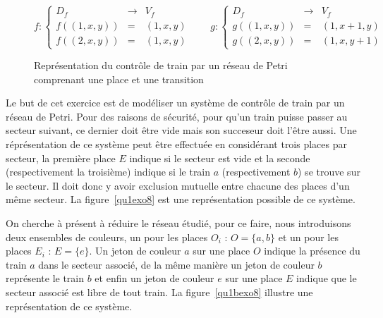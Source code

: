 \begin{figure}
    \begin{center}
    \end{center}
    \begin{displaymath}
        f : \left \lbrace
        \begin{array}{rcl}
            D_f & \rightarrow & V_f \\
            f((1, x, y)) & = & (1, x, y)\\
            f((2, x, y)) & = & (1, x, y)
        \end{array}
        \right . \qquad
        g : \left \lbrace
        \begin{array}{rcl}
            D_f & \rightarrow & V_f \\
            g((1, x, y)) & = & (1, x + 1, y) \\
            g((2, x, y)) & = & (1, x, y + 1)
        \end{array} 
        \right .
    \end{displaymath}
    \caption{Représentation du contrôle de train par un réseau de Petri comprenant une place et une
    transition}
    \label{bonusexo8}
\end{figure}

Le but de cet exercice est de modéliser un système de contrôle de train par un réseau de Petri. Pour
des raisons de sécurité, pour qu'un train puisse passer au secteur suivant, ce dernier doit être
vide mais son succeseur doit l'être aussi. Une réprésentation de ce système peut être effectuée en
considérant trois places par secteur, la première place $E$ indique si le secteur est vide et la
seconde (respectivement la troisième) indique si le train $a$ (respectivement $b$) se trouve sur le
secteur. Il doit donc y avoir exclusion mutuelle entre chacune des places d'un même secteur. La
figure~\ref{qu1exo8} est une représentation possible de ce système.

On cherche à présent à réduire le réseau étudié, pour ce faire, nous introduisons deux ensembles de
couleurs, un pour les places $O_i$ : $O = \{a, b\}$ et un pour les places $E_i$ : $E = \{e\}$. Un
jeton de couleur $a$ sur une place $O$ indique la présence du train $a$ dans le secteur associé, de
la même manière un jeton de couleur $b$ représente le train $b$ et enfin un jeton de couleur $e$ sur
une place $E$ indique que le secteur associé est libre de tout train. La figure~\ref{qu1bexo8}
illustre une représentation de ce système.

